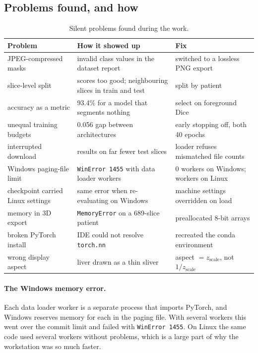 \documentclass[11pt,a4paper]{article}
\newcommand{\code}[1]{\texttt{#1}}
\begin{document}
\subsection{Problems found, and how}

\begin{table}[H]
\centering\small
\begin{tabular}{>{\raggedright}p{3.6cm}>{\raggedright}p{5.2cm}p{5.4cm}}
\toprule
\textbf{Problem} & \textbf{How it showed up} & \textbf{Fix} \\
\midrule
JPEG-compressed masks & invalid class values in the dataset report & switched to a lossless PNG export \\
slice-level split & scores too good; neighbouring slices in train and test & split by patient \\
accuracy as a metric & 93.4\% for a model that segments nothing & select on foreground Dice \\
unequal training budgets & 0.056 gap between architectures & early stopping off, both 40 epochs \\
interrupted download & results on far fewer test slices & loader refuses mismatched file counts \\
Windows paging-file limit & \code{WinError 1455} with data loader workers & 0 workers on Windows; workers on Linux \\
checkpoint carried Linux settings & same error when re-evaluating on Windows & machine settings overridden on load \\
memory in 3D export & \code{MemoryError} on a 689-slice patient & preallocated 8-bit arrays \\
broken PyTorch install & IDE could not resolve \code{torch.nn} & recreated the conda environment \\
wrong display aspect & liver drawn as a thin sliver & aspect $= z_{\text{scale}}$, not $1/z_{\text{scale}}$ \\
\bottomrule
\end{tabular}
\caption{Silent problems found during the work.}
\end{table}

\paragraph{The Windows memory error.} Each data loader worker is a separate
process that imports PyTorch, and Windows reserves memory for each in the paging
file. With several workers this went over the commit limit and failed with
\code{WinError 1455}. On Linux the same code used several workers without
problems, which is a large part of why the workstation was so much faster.
\end{document}
